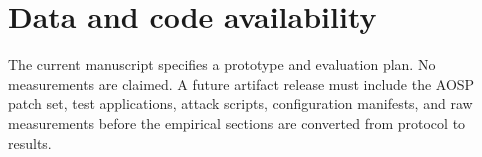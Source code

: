 \documentclass[preprint,12pt]{elsarticle}
\begin{document}
\section*{Data and code availability}
The current manuscript specifies a prototype and evaluation plan. No measurements are claimed. A future artifact release must include the AOSP patch set, test applications, attack scripts, configuration manifests, and raw measurements before the empirical sections are converted from protocol to results.



\end{document}
